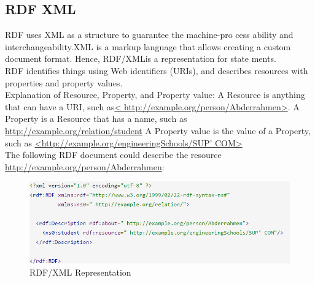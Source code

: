 \documentclass[a4paper,12pt,oneside]{report}
\begin{document}
{{{\subsection{RDF XML}
{RDF uses XML as a structure to guarantee the machine-pro cess ability and interchangeability.XML is a markup language that allows creating a custom document format. Hence, RDF/XMLis a representation for state ments.\\
RDF identifies things using Web identifiers (URIs), and describes resources with properties and property values.\\
Explanation of Resource, Property, and Property value:
A Resource is anything that can have a URI, such as\url{< http://example.org/person/Abderrahmen>}.
A Property is a Resource that has a name, such as \url {http://example.org/relation/student}
A Property value is the value of a Property, such as \url {<http://example.org/engineeringSchools/SUP’ COM>}\\
The following RDF document could describe the resource \url {http://example.org/person/Abderrahmen}:\\
\begin{figure}[ht]
\centering
\includegraphics[width=1\textwidth]{Capture21}
\caption{RDF/XML Representation}
\end{figure}
 }
}}}
\end{document}
